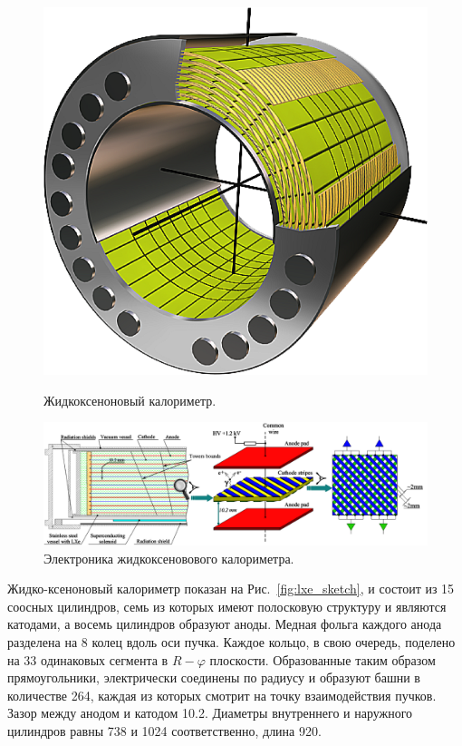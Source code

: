 \begin{figure}[htbp]
    \begin{minipage}[t]{0.27\textwidth}
        \centering
        \includegraphics[width=\textwidth]{img/cmd3_detector/lxe_sketch.png}
        \caption{Жидкоксеноновый калориметр.}\label{fig:lxe_sketch}
    \end{minipage}
    \hfill
    \begin{minipage}[t]{0.68\textwidth}
        \centering
        \includegraphics[width=\textwidth]{img/cmd3_detector/lxe_electrode_structure.png}
        \caption{Электроника жидкоксеновового калориметра.}\label{lxe_electrode_structure}
  \end{minipage}
\end{figure}

Жидко-ксеноновый калориметр показан на Рис.~\ref{fig:lxe_sketch},
и состоит из 15 соосных цилиндров,
семь из которых имеют полосковую структуру и являются катодами,
а восемь цилиндров образуют аноды.
Медная фольга каждого анода разделена на 8 колец вдоль оси пучка.
Каждое кольцо, в свою очередь,
поделено на \num{33} одинаковых сегмента в $R-\varphi$ плоскости. 
Образованные таким образом прямоугольники,
электрически соединены по радиусу и образуют башни в количестве \num{264}, каждая из которых смотрит на точку взаимодействия пучков.
Зазор между анодом и катодом \SI{10.2}{\mmr}.
Диаметры внутреннего и наружного цилиндров равны \SI{738}{\mmr} и \SI{1024}{\mmr} соответственно,
длина \SI{920}{\mmr}. 

